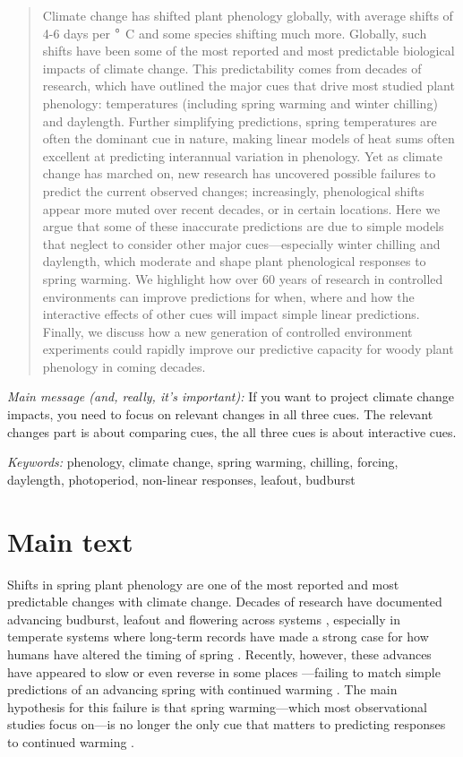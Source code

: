 \documentclass[11pt,letter]{article}
\begin{document}
\begin{abstract}
Climate change has shifted plant phenology globally, with average shifts of 4-6 days per $\degree$ C and some species shifting much more. Globally, such shifts have been some of the most reported and most predictable biological impacts of climate change. This predictability comes from decades of research, which have outlined the major cues that drive most studied plant phenology: temperatures (including spring warming and winter chilling) and daylength. Further simplifying predictions, spring temperatures are often the dominant cue in nature, making linear models of heat sums often excellent at predicting interannual variation in phenology. Yet as climate change has marched on, new research has uncovered possible failures to predict the current observed changes; increasingly, phenological shifts appear more muted over recent decades, or in certain locations. Here we argue that some of these inaccurate predictions are due to simple models that neglect to consider other major cues---especially winter chilling and daylength, which moderate and shape plant phenological responses to spring warming. We highlight how over 60 years of research in controlled environments can improve predictions for when, where and how the interactive effects of other cues will impact simple linear predictions. Finally, we discuss how a new generation of controlled environment experiments could rapidly improve our predictive capacity for woody plant phenology in coming decades.  
\end{abstract}

\noindent \emph{Main message (and, really, it's important):} If you want to project climate change impacts, you need to focus on relevant changes in all three cues. The relevant changes part is about comparing cues, the all three cues is about interactive cues.

\noindent \emph{Keywords:} phenology, climate change, spring warming, chilling, forcing, daylength, photoperiod, non-linear responses, leafout, budburst\\

\newpage
\linenumbers
\section{Main text}
Shifts in spring plant phenology are one of the most reported and most predictable changes with climate change. Decades of research have documented advancing budburst, leafout and flowering across systems \citep{delpierre2009, yu2010,Ellwood2012,jochner2013,hereford2017}, especially in temperate systems where long-term records have made a strong case for how humans have altered the timing of spring \citep{Schwartz:1997nn,Menzel2003a,Menzel:2006}. Recently, however, these advances have appeared to slow \citep{fu2015} or even reverse in some places \citep{yu2010}---failing to match simple predictions of an advancing spring with continued warming \citep{Ellwood2012}. The main hypothesis for this failure is that spring warming---which most observational studies focus on---is no longer the only cue that matters to predicting responses to continued warming \citep{chuine2016,gauzere2019}.\\
\end{document}

